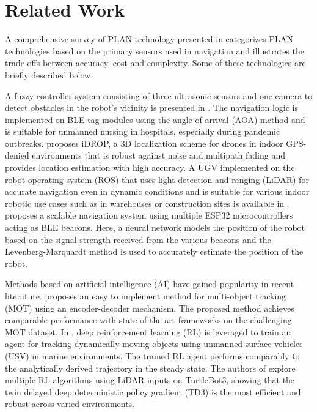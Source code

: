 \documentclass[conference]{IEEEtran}
\begin{document}
\section{Related Work}
\label{sec:related-work}

A comprehensive survey of PLAN technology presented in
\cite{el-sheimyIndoorNavigationState2021} categorizes PLAN technologies based on
the primary sensors used in navigation and illustrates the trade-offs between
accuracy, cost and complexity. Some of these technologies are briefly described
below.

A fuzzy
controller system  consisting of three ultrasonic sensors and one camera to
detect obstacles in the robot's vicinity is presented in \cite{narayananFuzzyGuidedAutonomous2022}. The navigation logic is implemented on
BLE tag modules using the angle of arrival (AOA) method and is suitable for
unmanned nursing in hospitals, especially during pandemic outbreaks. \cite{familiIDROPRobustLocalization2023} proposes iDROP, a 3D localization
scheme for drones in indoor GPS-denied environments that is robust against noise
and multipath fading and provides location estimation with high accuracy. A UGV implemented on the
robot operating system (ROS) that uses light detection and ranging (LiDAR) for
accurate navigation even in dynamic conditions and is suitable for various
indoor robotic use cases such as in warehouses or construction sites is available in \cite{htROSPoweredAutonomous2024}. \cite{yukhimetsLocalNavigationSystem2024} proposes a scalable
navigation system using multiple ESP32 microcontrollers acting as BLE beacons. Here, a 
neural network models the position of the robot based on the signal strength
received from the various beacons and the Levenberg-Marquardt method is used to
accurately estimate the position of the robot. 

Methods based on artificial intelligence (AI) have gained popularity in recent
literature. \cite{liuSimpleOnlineUnmanned2021} proposes an easy to
implement method for multi-object tracking (MOT) using an encoder-decoder
mechanism. The proposed method achieves comparable performance with
state-of-the-art frameworks on the challenging MOT dataset. In
\cite{masmitjaReinforcementLearningPath2022}, deep reinforcement
learning (RL) is leveraged to train an agent for tracking dynamically moving objects using
unmanned surface vehicles (USV) in marine environments. The trained RL agent
performs comparably to the analytically derived trajectory in the steady state.
The authors of \cite{kashyapAutonomousNavigationROS22025} explore multiple RL
algorithms using LiDAR inputs on TurtleBot3, showing that the twin delayed deep
deterministic policy gradient (TD3) is the most efficient and robust across
varied environments.
\end{document}

